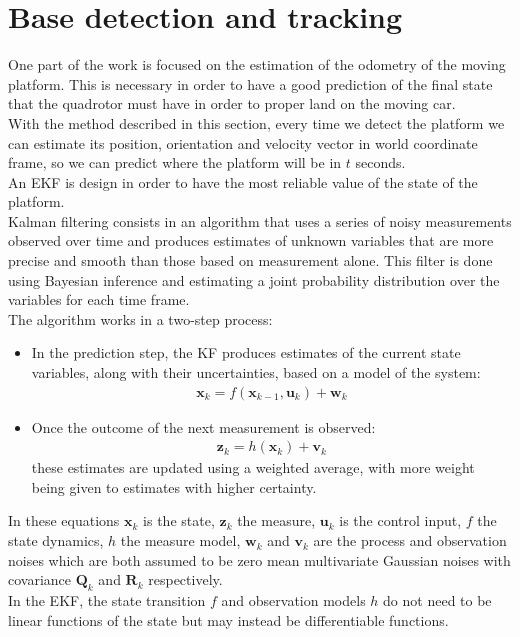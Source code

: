 \chapter{Base detection and tracking}\label{chap:base_tracking}
One part of the work is focused on the estimation of the odometry of the moving platform. This is necessary in order to have a good prediction of the final state that the quadrotor must have in order to proper land on the moving car. \\ 
With the method described in this section, every time we detect the platform we can estimate its position, orientation and velocity vector in world coordinate frame, so we can predict where the platform will be in $t$ seconds.\\

An EKF  \cite{kalmanfilter} is design in order to have the most reliable value of the state of the platform.\\
Kalman filtering consists in an algorithm that uses a series of noisy measurements observed over time and produces estimates of unknown variables that are more precise and smooth than those based on measurement alone. This filter is done using Bayesian inference and estimating a joint probability distribution over the variables for each time frame.\\
The algorithm works in a two-step process:
\begin{itemize}
\item In the prediction step, the KF produces estimates of the current state variables, along with their uncertainties, based on a model of the system:
\begin{align}
\boldsymbol{x}_k = f(\boldsymbol{x}_{k-1},\boldsymbol{u}_k) + \boldsymbol{w}_k
 \label{eq:ekf1}
\end{align}
\item Once the outcome of the next measurement is observed:
\begin{align}
\boldsymbol{z}_k = h(\boldsymbol{x}_{k}) + \boldsymbol{v}_k
 \label{eq:ekf2}
\end{align}
these estimates are updated using a weighted average, with more weight being given to estimates with higher certainty.
\end{itemize}
In these equations $\boldsymbol{x}_k$ is the state, $\boldsymbol{z}_k$ the measure, $\boldsymbol{u}_k$ is the control input, $f$ the state dynamics, $h$ the measure model, $\boldsymbol{w}_k$ and $\boldsymbol{v}_k$ are the process and observation noises which are both assumed to be zero mean multivariate Gaussian noises with covariance $\boldsymbol{Q}_k$ and $\boldsymbol{R}_k$ respectively. \\
In the EKF, the state transition $f$ and observation models  $h$ do not need to be linear functions of the state but may instead be differentiable functions.\\

